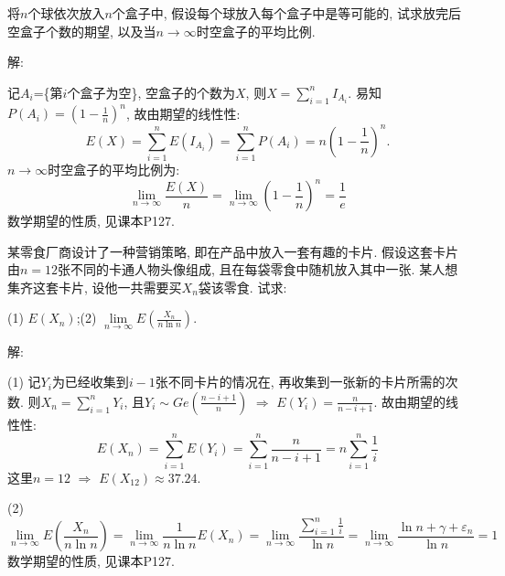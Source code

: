 \documentclass[standard]{ExBook}
\renewenvironment{shaded}{%
  \def\FrameCommand{\fboxsep=\FrameSep \colorbox{shadecolor}}%
  \MakeFramed{\advance\hsize-\width \FrameRestore}%
}{%
  \endMakeFramed
}
\begin{document}
\begin{qitems}
\vspace{2.5cm-5em}

    \begin{bbox}
    \begin{shaded}
        \qitem
将$n$个球依次放入$n$个盒子中, 假设每个球放入每个盒子中是等可能的, 试求放完后空盒子个数的期望, 以及当$n\to \infty$时空盒子的平均比例.
    \end{shaded}
    \end{bbox}

\vspace{\dimexpr2.5cm-5em\relax}

解: 

记$A_{i}$=\{第$i$个盒子为空\}, 空盒子的个数为$X$, 则$X=\displaystyle\sum\limits_{i=1}^{n}I_{A_{i}}$. 易知$P(A_{i})=\left(1-\frac{1}{n}\right)^{n}$, 故由期望的线性性:
$$E(X)=\displaystyle\sum\limits_{i=1}^{n}E(I_{A_{i}})=\sum\limits_{i=1}^{n}P(A_{i})=n\left(1-\frac{1}{n}\right)^{n}.$$
$n\to \infty$时空盒子的平均比例为:
$$\lim\limits_{n\to\infty}\frac{E(X)}{n}=\lim\limits_{n\to\infty}\left(1-\frac{1}{n}\right)^{n}=\frac{1}{e}$$
\textcolor{themeColor}{\selectfont {}
数学期望的性质, 见课本P127.}

\vspace{2.5cm-5em}

    \begin{bbox}
    \begin{shaded}
        \qitem
某零食厂商设计了一种营销策略, 即在产品中放入一套有趣的卡片. 假设这套卡片由$n =12$张不同的卡通人物头像组成, 且在每袋零食中随机放入其中一张. 某人想集齐这套卡片, 设他一共需要买$X_n$袋该零食. 试求:

\vspace{0.5em}
(1) $E(X_n)$;\qquad (2) $\lim\limits_{n\to\infty}E\left(\displaystyle\frac{X_n}{n\ln n}\right)$.
    \end{shaded}
    \end{bbox}

\vspace{\dimexpr2.5cm-5em\relax}

解: 

(1) 记$Y_{i}$为已经收集到$i-1$张不同卡片的情况在, 再收集到一张新的卡片所需的次数. 则$X_{n}=\sum\limits_{i=1}^{n}Y_{i}$, 且$Y_{i}\sim Ge(\frac{n-i+1}{n})$ $\Longrightarrow$ $E(Y_{i})=\frac{n}{n-i+1}$. 故由期望的线性性:
$$E(X_{n})=\sum\limits_{i=1}^{n}E(Y_{i})=\sum\limits_{i=1}^{n}\frac{n}{n-i+1}=n\sum\limits_{i=1}^{n}\frac{1}{i}$$
这里$n=12$ $\Longrightarrow$ $E(X_{12})\approx37.24$.

(2) 
$$\lim\limits_{n\to\infty}E\left(\displaystyle\frac{X_n}{n\ln n}\right)=\lim\limits_{n\to\infty}\frac{1}{n\ln n}E(X_n)=\lim\limits_{n\to\infty}\frac{\sum\limits_{i=1}^{n}\frac{1}{i}}{\ln n}=\lim\limits_{n\to\infty}\frac{\ln n+\gamma+\varepsilon_n}{\ln n}=1$$
\textcolor{themeColor}{\selectfont {}
数学期望的性质, 见课本P127.}


\end{qitems}
\end{document}
